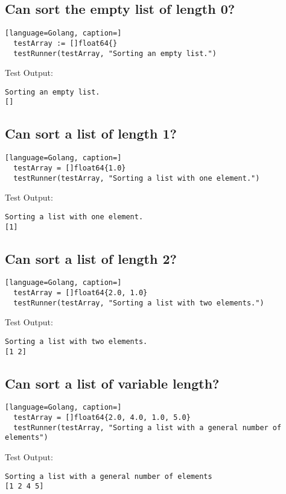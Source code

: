 \documentclass{article}
\begin{document}
\subsection{Can sort the empty list of length 0?}
\begin{lstlisting}[language=Golang, caption=]
  testArray := []float64{}
  testRunner(testArray, "Sorting an empty list.")
\end{lstlisting}

Test Output:
\begin{lstlisting}
Sorting an empty list.
[]
\end{lstlisting}

\subsection{Can sort a list of length 1?}
\begin{lstlisting}[language=Golang, caption=]
  testArray = []float64{1.0}
  testRunner(testArray, "Sorting a list with one element.")
\end{lstlisting}

Test Output:
\begin{lstlisting}
Sorting a list with one element.
[1]
\end{lstlisting}


\subsection{Can sort a list of length 2?}

\begin{lstlisting}[language=Golang, caption=]
  testArray = []float64{2.0, 1.0}
  testRunner(testArray, "Sorting a list with two elements.")
\end{lstlisting}
Test Output:
\begin{lstlisting}
Sorting a list with two elements.
[1 2]
\end{lstlisting}


\subsection{Can sort a list of variable length?}
\begin{lstlisting}[language=Golang, caption=]
  testArray = []float64{2.0, 4.0, 1.0, 5.0}
  testRunner(testArray, "Sorting a list with a general number of elements")
\end{lstlisting}

Test Output:
\begin{lstlisting}
Sorting a list with a general number of elements
[1 2 4 5]
\end{lstlisting}
\end{document}
